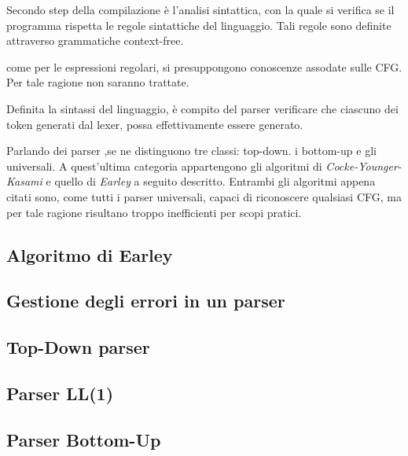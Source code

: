 \documentclass{subfiles}
\begin{document}
Secondo step della compilazione è l'analisi sintattica, con la quale si verifica se il programma rispetta le regole sintattiche del linguaggio.
Tali regole sono definite attraverso grammatiche context-free.

\begin{Note*}
    come per le espressioni regolari, si presuppongono conoscenze assodate sulle CFG.
    Per tale ragione non saranno trattate.
\end{Note*}
Definita la sintassi del linguaggio, è compito del parser verificare che ciascuno dei token generati dal lexer, possa effettivamente essere generato.

Parlando dei parser ,se ne distinguono tre classi: top-down. i bottom-up e gli universali.
A quest'ultima categoria appartengono gli algoritmi di \emph{Cocke-Younger-Kasami} e quello di \emph{Earley} a seguito descritto.
Entrambi gli algoritmi appena citati sono, come tutti i parser universali, capaci di riconoscere qualsiasi CFG,
ma per tale ragione risultano troppo inefficienti per scopi pratici.

\subsection{Algoritmo di Earley}

\clearpage

\subsection{Gestione degli errori in un parser}


\subsection{Top-Down parser}

\clearpage

\subsection{Parser LL(1)}

\clearpage

\subsection{Parser Bottom-Up}

\end{document}
